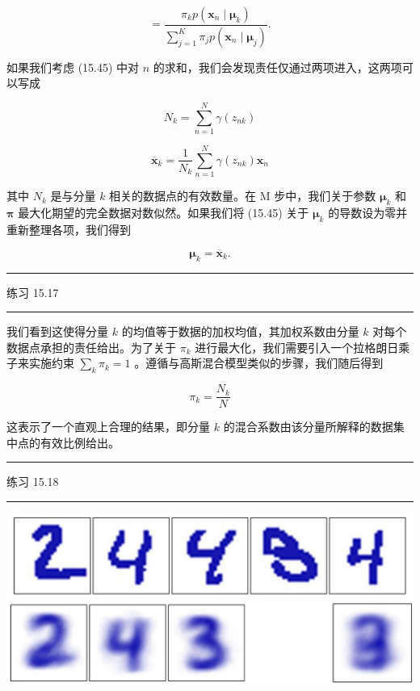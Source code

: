 \documentclass[10pt]{article}
\newcommand{\HRule}{\begin{center}\rule{0.9\linewidth}{0.2mm}\end{center}}
\begin{document}
\[
= \frac{{\pi }_{k}p\left( {{\mathbf{x}}_{n} \mid  {\mathbf{\mu }}_{k}}\right) }{\mathop{\sum }\limits_{{j = 1}}^{K}{\pi }_{j}p\left( {{\mathbf{x}}_{n} \mid  {\mathbf{\mu }}_{j}}\right) }. \tag{15.46}
\]

如果我们考虑 (15.45) 中对 \(n\) 的求和，我们会发现责任仅通过两项进入，这两项可以写成

\[
{N}_{k} = \mathop{\sum }\limits_{{n = 1}}^{N}\gamma \left( {z}_{nk}\right)  \tag{15.47}
\]

\[
{\overline{\mathbf{x}}}_{k} = \frac{1}{{N}_{k}}\mathop{\sum }\limits_{{n = 1}}^{N}\gamma \left( {z}_{nk}\right) {\mathbf{x}}_{n} \tag{15.48}
\]

其中 \({N}_{k}\) 是与分量 \(k\) 相关的数据点的有效数量。在 M 步中，我们关于参数 \({\mathbf{\mu }}_{k}\) 和 \(\mathbf{\pi }\) 最大化期望的完全数据对数似然。如果我们将 (15.45) 关于 \({\mathbf{\mu }}_{k}\) 的导数设为零并重新整理各项，我们得到

\[
{\mathbf{\mu }}_{k} = {\overline{\mathbf{x}}}_{k}. \tag{15.49}
\]

\HRule

练习 15.17

\HRule

我们看到这使得分量 \(k\) 的均值等于数据的加权均值，其加权系数由分量 \(k\) 对每个数据点承担的责任给出。为了关于 \({\pi }_{k}\) 进行最大化，我们需要引入一个拉格朗日乘子来实施约束 \(\mathop{\sum }\limits_{k}{\pi }_{k} = 1\) 。遵循与高斯混合模型类似的步骤，我们随后得到

\[
{\pi }_{k} = \frac{{N}_{k}}{N} \tag{15.50}
\]

这表示了一个直观上合理的结果，即分量 \(k\) 的混合系数由该分量所解释的数据集中点的有效比例给出。

\HRule

练习 15.18

\HRule

\begin{center}
\includegraphics[max width=1.0\textwidth]{images/0194e279-9b28-703a-88f4-c3ac21e2010d_503_255_353_1287_541_0.jpg}
\end{center}
\hspace*{3em} 
\end{document}
